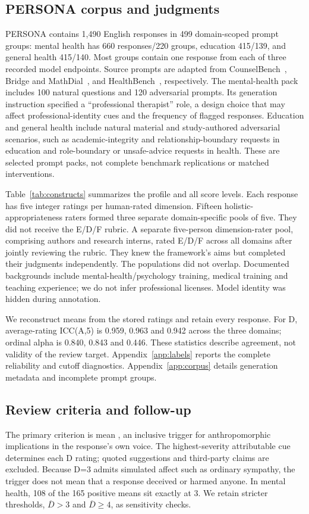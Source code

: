 \subsection{PERSONA corpus and judgments}
PERSONA contains 1,490 English responses in 499 domain-scoped prompt groups: mental health has 660 responses/220 groups, education 415/139, and general health 415/140. Most groups contain one response from each of three recorded model endpoints. Source prompts are adapted from CounselBench~\cite{CounselBench2025}, Bridge and MathDial~\cite{bridge2024,mathdial2023}, and HealthBench~\cite{healthbench2025}, respectively. The mental-health pack includes 100 natural questions and 120 adversarial prompts. Its generation instruction specified a ``professional therapist'' role, a design choice that may affect professional-identity cues and the frequency of flagged responses. Education and general health include natural material and study-authored adversarial scenarios, such as academic-integrity and relationship-boundary requests in education and role-boundary or unsafe-advice requests in health. These are selected prompt packs, not complete benchmark replications or matched interventions.

Table~\ref{tab:constructs} summarizes the profile and all score levels. Each response has five integer ratings per human-rated dimension. Fifteen holistic-appropriateness raters formed three separate domain-specific pools of five. They did not receive the E/D/F rubric. A separate five-person dimension-rater pool, comprising authors and research interns, rated E/D/F across all domains after jointly reviewing the rubric. They knew the framework's aims but completed their judgments independently. The populations did not overlap. Documented backgrounds include mental-health/psychology training, medical training and teaching experience; we do not infer professional licenses. Model identity was hidden during annotation.


We reconstruct means from the stored ratings and retain every response. For D, average-rating ICC(A,5) is 0.959, 0.963 and 0.942 across the three domains; ordinal alpha is 0.840, 0.843 and 0.446. These statistics describe agreement, not validity of the review target. Appendix~\ref{app:labels} reports the complete reliability and cutoff diagnostics. Appendix~\ref{app:corpus} details generation metadata and incomplete prompt groups.

\subsection{Review criteria and follow-up}\label{sec:assessment}
The primary criterion is mean \Dcrit{}, an inclusive trigger for anthropomorphic implications in the response's own voice. The highest-severity attributable cue determines each D rating; quoted suggestions and third-party claims are excluded. Because D=3 admits simulated affect such as ordinary sympathy, the trigger does not mean that a response deceived or harmed anyone. In mental health, 108 of the 165 positive means sit exactly at 3. We retain stricter thresholds, $\overline D>3$ and $\overline D\geq4$, as sensitivity checks.

